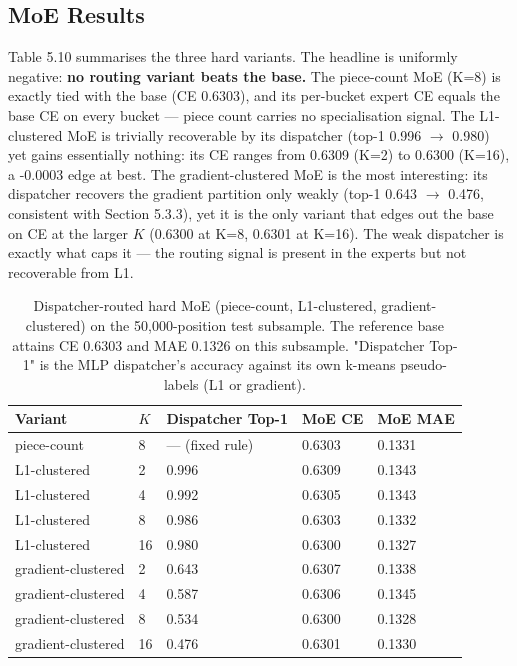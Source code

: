 \subsection{MoE Results}

Table 5.10 summarises the three hard variants. The headline is uniformly negative: \textbf{no routing variant beats the base.} The piece-count MoE (K=8) is exactly tied with the base (CE 0.6303), and its per-bucket expert CE equals the base CE on every bucket --- piece count carries no specialisation signal. The L1-clustered MoE is trivially recoverable by its dispatcher (top-1 0.996 $\to$ 0.980) yet gains essentially nothing: its CE ranges from 0.6309 (K=2) to 0.6300 (K=16), a -0.0003 edge at best. The gradient-clustered MoE is the most interesting: its dispatcher recovers the gradient partition only weakly (top-1 0.643 $\to$ 0.476, consistent with Section 5.3.3), yet it is the only variant that edges out the base on CE at the larger $K$ (0.6300 at K=8, 0.6301 at K=16). The weak dispatcher is exactly what caps it --- the routing signal is present in the experts but not recoverable from L1.

\begin{table}[H]
\centering
\caption{Dispatcher-routed hard MoE (piece-count, L1-clustered, gradient-clustered) on the 50,000-position test subsample. The reference base attains CE 0.6303 and MAE 0.1326 on this subsample. "Dispatcher Top-1" is the MLP dispatcher's accuracy against its own k-means pseudo-labels (L1 or gradient).}
\small
\begin{tabular}{lllll}
\toprule
Variant & $K$ & Dispatcher Top-1 & MoE CE & MoE MAE \\
\midrule
piece-count & 8 & --- (fixed rule) & 0.6303 & 0.1331 \\
L1-clustered & 2 & 0.996 & 0.6309 & 0.1343 \\
L1-clustered & 4 & 0.992 & 0.6305 & 0.1343 \\
L1-clustered & 8 & 0.986 & 0.6303 & 0.1332 \\
L1-clustered & 16 & 0.980 & 0.6300 & 0.1327 \\
gradient-clustered & 2 & 0.643 & 0.6307 & 0.1338 \\
gradient-clustered & 4 & 0.587 & 0.6306 & 0.1345 \\
gradient-clustered & 8 & 0.534 & 0.6300 & 0.1328 \\
gradient-clustered & 16 & 0.476 & 0.6301 & 0.1330 \\
\bottomrule
\end{tabular}
\end{table}




